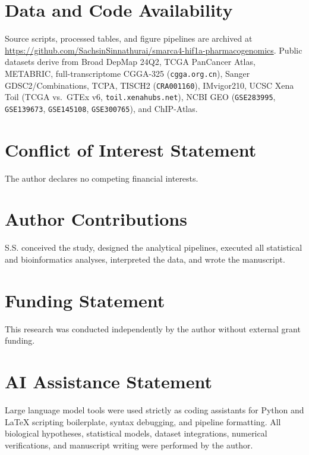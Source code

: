 \documentclass[10pt,twocolumn]{article}
\begin{document}
\vspace{-4pt}
\section*{Data and Code Availability}
\vspace{-3pt}
{\raggedright Source scripts, processed tables, and figure pipelines are archived at \url{https://github.com/SachsinSinnathurai/smarca4-hif1a-pharmacogenomics}. Public datasets derive from Broad DepMap 24Q2, TCGA PanCancer Atlas, METABRIC, full-transcriptome CGGA-325 (\texttt{cgga.org.cn}), Sanger GDSC2/Combinations, TCPA, TISCH2 (\texttt{CRA001160}), IMvigor210, UCSC Xena Toil (TCGA vs.\ GTEx v6, \texttt{toil.xenahubs.net}), NCBI GEO (\texttt{GSE283995}, \texttt{GSE139673}, \texttt{GSE145108}, \texttt{GSE300765}), and ChIP-Atlas.\par}

\vspace{-6pt}
\section*{Conflict of Interest Statement}
\vspace{-3pt}
The author declares no competing financial interests.

\vspace{-6pt}
\section*{Author Contributions}
\vspace{-3pt}
S.S. conceived the study, designed the analytical pipelines, executed all statistical and bioinformatics analyses, interpreted the data, and wrote the manuscript.

\vspace{-6pt}
\section*{Funding Statement}
\vspace{-3pt}
This research was conducted independently by the author without external grant funding.

\section*{AI Assistance Statement}
Large language model tools were used strictly as coding assistants for Python and LaTeX scripting boilerplate, syntax debugging, and pipeline formatting. All biological hypotheses, statistical models, dataset integrations, numerical verifications, and manuscript writing were performed by the author.
\end{document}

